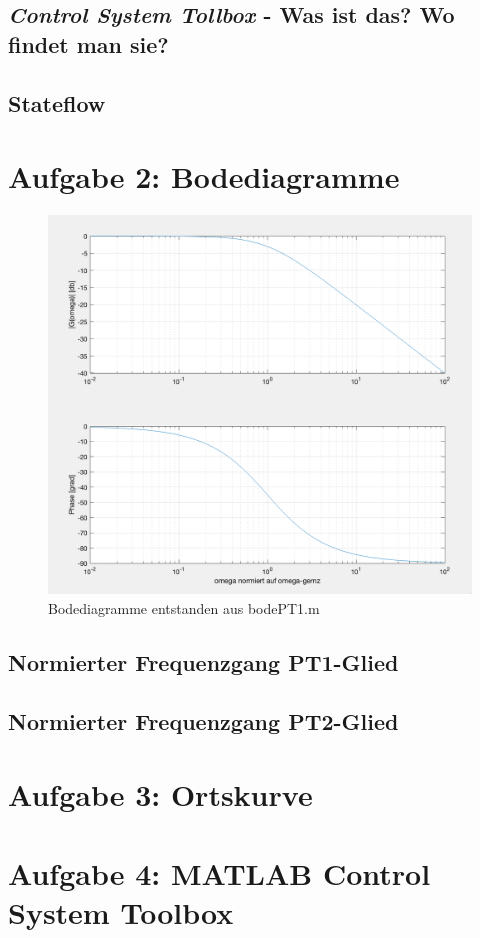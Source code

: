 \documentclass{article}
\begin{document}
		\subsection{\textit{Control System Tollbox} - Was ist das? Wo findet man sie?}
		\subsection{Stateflow}
		
	\newpage	
	\section{Aufgabe 2: Bodediagramme}
		\begin{figure}[h]
 		 	\includegraphics[scale=0.3]{Bodediagramme.png}
			\caption{Bodediagramme entstanden aus bodePT1.m}
			\label{fig1: Bodediagramm1}
		\end{figure}
		
		
		\subsection{Normierter Frequenzgang PT1-Glied}
		
		\subsection{Normierter Frequenzgang PT2-Glied}
	
	\newpage	
	\section{Aufgabe 3: Ortskurve}
	
	\newpage
	\section{Aufgabe 4: MATLAB Control System Toolbox}
	
\end{document}
